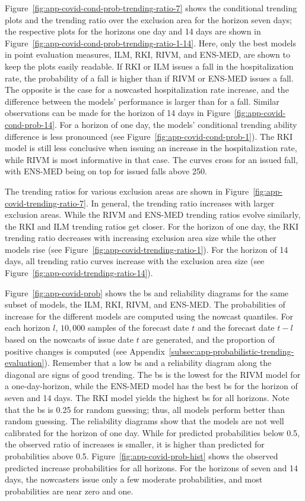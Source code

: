\documentclass[pdflatex]{sn-jnl}
\theoremstyle{plain}%
\theoremstyle{definition}
\begin{document}
Figure~\ref{fig:app-covid-cond-prob-trending-ratio-7} shows the conditional trending plots and the trending ratio over the exclusion area for the horizon seven days; the respective plots for the horizons one day and 14 days are shown in Figure~\ref{fig:app-covid-cond-prob-trending-ratio-1-14}.
Here, only the best models in point evaluation measures, ILM, RKI, RIVM, and ENS-MED, are shown to keep the plots easily readable.
If RKI or ILM issues a fall in the hospitalization rate, the probability of a fall is higher than if RIVM or ENS-MED issues a fall.
The opposite is the case for a nowcasted hospitalization rate increase, and the difference between the models' performance is larger than for a fall.
Similar observations can be made for the horizon of 14 days in Figure~\ref{fig:app-covid-cond-prob-14}.
For a horizon of one day, the models' conditional trending ability difference is less pronounced (see Figure~\ref{fig:app-covid-cond-prob-1}).
The RKI model is still less conclusive when issuing an increase in the hospitalization rate, while RIVM is most informative in that case.
The curves cross for an issued fall, with ENS-MED being on top for issued falls above 250.

The trending ratios for various exclusion areas are shown in Figure~\ref{fig:app-covid-trending-ratio-7}.
In general, the trending ratio increases with larger exclusion areas.
While the RIVM and ENS-MED trending ratios evolve similarly, the RKI and ILM trending ratios get closer.
For the horizon of one day, the RKI trending ratio decreases with increasing exclusion area size while the other models rise (see Figure~\ref{fig:app-covid-trending-ratio-1}).
For the horizon of 14 days, all trending ratio curves increase with the exclusion area size (see Figure~\ref{fig:app-covid-trending-ratio-14}).

Figure~\ref{fig:app-covid-prob} shows the \acf{bs} and reliability diagrams for the same subset of models, the ILM, RKI, RIVM, and ENS-MED.
The probabilities of increase for the different models are computed using the nowcast quantiles.
For each horizon $l$, $10,000$ samples of the forecast date $t$ and the forecast date $t-l$ based on the nowcasts of issue date $t$ are generated, and the proportion of positive changes is computed (see Appendix~\ref{subsec:app-probabilistic-trending-evaluation}).
Remember that a low \ac{bs} and a reliability diagram along the diagonal are signs of good trending.
The \ac{bs} is the lowest for the RIVM model for a one-day-horizon, while the ENS-MED model has the best \ac{bs} for the horizon of seven and 14 days.
The RKI model yields the highest \ac{bs} for all horizons.
Note that the \ac{bs} is 0.25 for random guessing; thus, all models perform better than random guessing.
The reliability diagrams show that the models are not well calibrated for the horizon of one day.
While for predicted probabilities below 0.5, the observed ratio of increases is smaller, it is higher than predicted for probabilities above 0.5.
Figure~\ref{fig:app-covid-prob-hist} shows the observed predicted increase probabilities for all horizons.
For the horizons of seven and 14 days, the nowcasters issue only a few moderate probabilities, and most probabilities are near zero and one.
\end{document}
